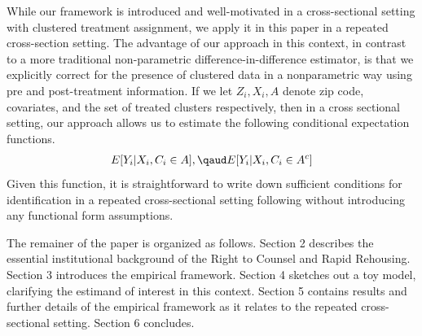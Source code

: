 \documentclass[a4paper,12pt]{article}
\begin{document}




While our framework is introduced and well-motivated in a cross-sectional setting with clustered treatment assignment, we apply it in this paper in a repeated cross-section setting. The advantage of our approach in this context, in contrast to a more traditional non-parametric difference-in-difference estimator, is that we explicitly correct for the presence of clustered data in a nonparametric way using pre and post-treatment information. If we let $Z_i, X_i, A$ denote zip code, covariates, and the set of treated clusters respectively, then in a cross sectional setting, our approach allows us to estimate the following conditional expectation functions. 
\begin{align*}
    E[Y_i |X_i, C_i \in A], \qaud    E[Y_i |X_i, C_i \in A^c]
\end{align*}
Given this function, it is straightforward to write down sufficient conditions for identification in a repeated cross-sectional setting following \cite{angrist2009mostly} without introducing any functional form assumptions. \par 

The remainer of the paper is organized as follows. Section 2 describes the essential institutional background of the Right to Counsel and Rapid Rehousing. Section 3 introduces the empirical framework. Section 4 sketches out a toy model, clarifying the estimand of interest in this context. Section 5 contains results and further details of the empirical framework as it relates to the repeated cross-sectional setting. Section 6 concludes.   










\end{document}
